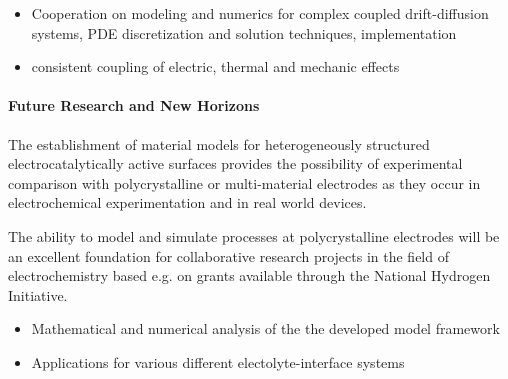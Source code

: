 \documentclass[a4paper,10pt]{article}
\begin{document}
\begin{itemize}
\item Cooperation on modeling and numerics for complex coupled drift-diffusion systems, PDE
  discretization and solution techniques, implementation
\item consistent coupling of electric, thermal and mechanic effects
\end{itemize}


\paragraph{Future Research and New Horizons}
The establishment of material models for heterogeneously structured electrocatalytically active surfaces
provides the possibility of experimental comparison with polycrystalline or  multi-material electrodes
as they occur in electrochemical experimentation and in real world devices.

The ability to model and simulate processes at polycrystalline electrodes will be an excellent foundation
for collaborative research projects in the field of electrochemistry based e.g. on grants available through
the National Hydrogen Initiative.

\begin{itemize}
\item Mathematical and numerical  analysis  of the the developed model framework
\item Applications for various different electolyte-interface systems
\end{itemize}




\end{document}
